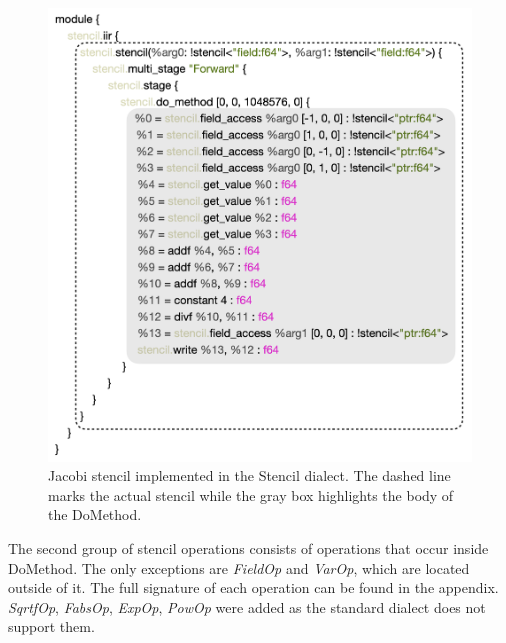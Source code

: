 \documentclass[sigplan,\review anonymous]{acmart}
\begin{document}
\begin{figure}
  \centering
  \includegraphics[width=\columnwidth]{images/jacobi_stencil.png}
  \caption{Jacobi stencil implemented in the Stencil dialect.
  The dashed line marks the actual stencil while the gray box
  highlights the body of the DoMethod.}
  \label{fig:jacobi_stencil}
\end{figure}

The second group of stencil operations consists of operations that occur
inside DoMethod. The only exceptions are \textit{FieldOp} and \textit{VarOp},
which are located outside of it. The full signature of each operation can be
found in the appendix. \textit{SqrtfOp}, \textit{FabsOp}, \textit{ExpOp},
\textit{PowOp} were added as the standard dialect does not support them.
\end{document}
